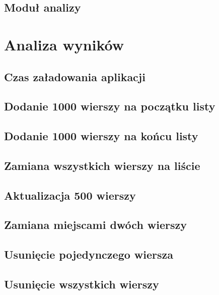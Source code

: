 \subsection{Moduł analizy}

\section{Analiza wyników}
\subsection{Czas załadowania aplikacji}
\subsection{Dodanie 1000 wierszy na początku listy}
\subsection{Dodanie 1000 wierszy na końcu listy}
\subsection{Zamiana wszystkich wierszy na liście}
\subsection{Aktualizacja 500 wierszy}
\subsection{Zamiana miejscami dwóch wierszy}
\subsection{Usunięcie pojedynczego wiersza}
\subsection{Usunięcie wszystkich wierszy}





